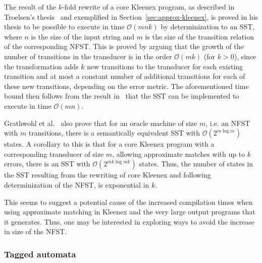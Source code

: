 The result of the $k$-fold rewrite of a core Kleenex program, as described in
Troelsen's thesis~\cite{troelsen2016approximate} and exemplified in
Section~\ref{sec:approx-kleenex}, is proved in his thesis to be possible to
execute in time $\mathcal{O}(mnk)$ by determinization to an SST, where $n$ is
the size of the input string and $m$ is the size of the transition relation of
the corresponding NFST. This is proved by arguing that the growth of the number
of transitions in the transducer is in the order $\mathcal{O}(mk)$ (for $k>0$),
since the transformation adds $k$ new transitions to the transducer for each
existing transition and at most a constant number of additional transitions for
each of these new transitions, depending on the error metric. The
aforementioned time bound then follows from the result
in~\cite{grathwohl2016kleenex} that the SST can be implemented to execute in
time $\mathcal{O}(mn)$.


Grathwohl et al.~\cite{grathwohl2016kleenex} also prove that for an oracle
machine of size $m$, i.e. an NFST with $m$ transitions, there is a semantically
equivalent SST with $\mathcal{O}(2^{m \log m})$ states. A corollary to this is
that for a core Kleenex program with a corresponding transducer of size $m$,
allowing approximate matches with up to $k$ errors, there is an SST with
$\mathcal{O}(2^{mk \log mk})$ states. Thus, the number of states in the SST
resulting from the rewriting of core Kleenex and following determinization of
the NFST, is exponential in $k$.

This seems to suggest a potential cause of the increased compilation times when
using approximate matching in Kleenex and the very large output programs that
it generates. Thus, one may be interested in exploring ways to avoid the
increase in size of the NFST.




\subsubsection{Tagged automata}

